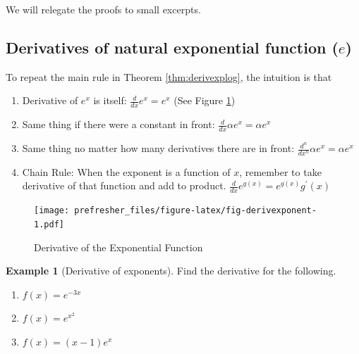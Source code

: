 \documentclass[
]{book}
\providecommand{\tightlist}{%
  \setlength{\itemsep}{0pt}\setlength{\parskip}{0pt}}
\theoremstyle{definition}
\theoremstyle{definition}
\newtheorem{example}{Example}[chapter]
\theoremstyle{definition}
\theoremstyle{remark}
\begin{document}
We will relegate the proofs to small excerpts.

\hypertarget{derivatives-of-natural-exponential-function-e}{%
\subsection*{\texorpdfstring{Derivatives of natural exponential function (\(e\))}{Derivatives of natural exponential function (e)}}\label{derivatives-of-natural-exponential-function-e}}

To repeat the main rule in Theorem \ref{thm:derivexplog}, the intuition is that

\begin{enumerate}
\def\labelenumi{\arabic{enumi}.}
\tightlist
\item
  Derivative of \(e^x\) is itself: \(\frac{d}{dx}e^x = e^x\) (See Figure \ref{fig:fig-derivexponent})
\item
  Same thing if there were a constant in front: \(\frac{d}{dx}\alpha e^x = \alpha e^x\)
\item
  Same thing no matter how many derivatives there are in front: \(\frac{d^n}{dx^n} \alpha e^x = \alpha e^x\)
\item
  Chain Rule: When the exponent is a function of \(x\), remember to take derivative of that function and add to product. \(\frac{d}{dx}e^{g(x)}= e^{g(x)} g^\prime(x)\)
\end{enumerate}

\begin{figure}
\centering
\texttt{[image: prefresher\_files/figure-latex/fig-derivexponent-1.pdf]}
\caption{\label{fig:fig-derivexponent}Derivative of the Exponential Function}
\end{figure}

\begin{example}[Derivative of exponents]
\protect\hypertarget{exm:exmderivexp}{}{\label{exm:exmderivexp} {} }Find the derivative for the following.

\begin{enumerate}
\def\labelenumi{\arabic{enumi}.}
\tightlist
\item
  \(f(x)=e^{-3x}\)
\item
  \(f(x)=e^{x^2}\)
\item
  \(f(x)=(x-1)e^x\)
\end{enumerate}
\end{example}
\end{document}

